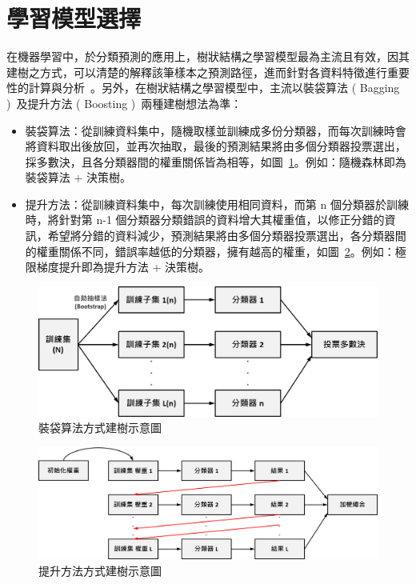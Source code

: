 \section{學習模型選擇}

在機器學習中，於分類預測的應用上，樹狀結構之學習模型最為主流且有效，因其建樹之方式，可以清楚的解釋該筆樣本之預測路徑，進而針對各資料特徵進行重要性的計算與分析~\cite{lee2018game}。另外，在樹狀結構之學習模型中，主流以裝袋算法 ( Bagging )~\cite{breiman1996bagging}及提升方法 ( Boosting )~\cite{freund1999short}兩種建樹想法為準：

\begin{itemize}
    \item 裝袋算法：從訓練資料集中，隨機取樣並訓練成多份分類器，而每次訓練時會將資料取出後放回，並再次抽取，最後的預測結果將由多個分類器投票選出，採多數決，且各分類器間的權重關係皆為相等，如圖~\ref{fig:Bagging}。例如：隨機森林即為裝袋算法 + 決策樹。
    \item 提升方法：從訓練資料集中，每次訓練使用相同資料，而第 n 個分類器於訓練時，將針對第 n-1 個分類器分類錯誤的資料增大其權重值，以修正分錯的資訊，希望將分錯的資料減少，預測結果將由多個分類器投票選出，各分類器間的權重關係不同，錯誤率越低的分類器，擁有越高的權重，如圖~\ref{fig:Boosting}。例如：極限梯度提升即為提升方法 + 決策樹。
\end{itemize}

\begin{figure}[!htb]
    \begin{center}
      \includegraphics[width=1\textwidth]{figures/Image_Bagging.png}
      \caption[裝袋算法方式建樹示意圖]{裝袋算法方式建樹示意圖}
      \label{fig:Bagging}
    \end{center}
\end{figure}

\begin{figure}[!htb]
    \begin{center}
      \includegraphics[width=1\textwidth]{figures/Image_Boosting.png}
      \caption[提升方法方式建樹示意圖]{提升方法方式建樹示意圖}
      \label{fig:Boosting}
    \end{center}
\end{figure}

